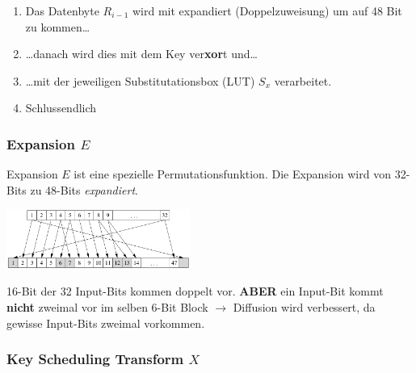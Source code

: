 \documentclass[
  10pt,
  a4paper,
  twocolumn]{article}
\providecommand{\tightlist}{%
  \setlength{\itemsep}{0pt}\setlength{\parskip}{0pt}}\usepackage{longtable,booktabs,array}
\begin{document}
\begin{enumerate}
\def\labelenumi{\arabic{enumi}.}
\tightlist
\item
  Das Datenbyte \(R_{i-1}\) wird mit expandiert (Doppelzuweisung) um auf
  48 Bit zu kommen\ldots{}
\item
  \ldots danach wird dies mit dem Key ver\textbf{xor}t und\ldots{}
\item
  \ldots mit der jeweiligen Substitutationsbox (LUT) \(S_x\)
  verarbeitet.
\item
  Schlussendlich
\end{enumerate}

\subsubsection{\texorpdfstring{Expansion
\(E\)}{Expansion E}}\label{expansion-e}

Expansion \(E\) ist eine spezielle Permutationsfunktion. Die Expansion
wird von 32-Bits zu 48-Bits \emph{expandiert}.

\begin{center}
\includegraphics[width=6cm,height=\textheight]{images/crypto/expansion_function.png}
\end{center}

\begin{tcolorbox}[enhanced jigsaw, colframe=quarto-callout-important-color-frame, bottomrule=.15mm, colback=white, left=2mm, toprule=.15mm, arc=.35mm, coltitle=black, opacityback=0, rightrule=.15mm, title=\textcolor{quarto-callout-important-color}{\faExclamation}\hspace{0.5em}{Wichtig}, colbacktitle=quarto-callout-important-color!10!white, opacitybacktitle=0.6, toptitle=1mm, bottomtitle=1mm, titlerule=0mm, leftrule=.75mm, breakable]

16-Bit der 32 Input-Bits kommen doppelt vor. \textbf{ABER} ein Input-Bit
kommt \textbf{nicht} zweimal vor im selben 6-Bit Block \(\rightarrow\)
Diffusion wird verbessert, da gewisse Input-Bits zweimal vorkommen.

\end{tcolorbox}

\subsubsection{\texorpdfstring{Key Scheduling Transform
\(X\)}{Key Scheduling Transform X}}\label{key-scheduling-transform-x}
\end{document}
